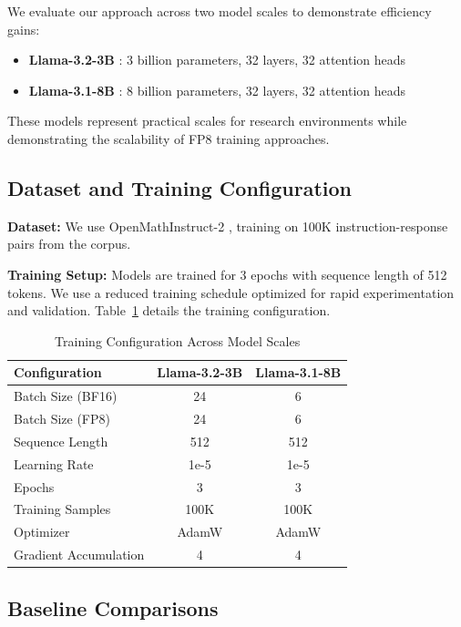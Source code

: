 \documentclass[conference]{IEEEtran}
\begin{document}
We evaluate our approach across two model scales to demonstrate efficiency gains:

\begin{itemize}
\item \textbf{Llama-3.2-3B} \cite{meta2024llama3.2}: 3 billion parameters, 32 layers, 32 attention heads
\item \textbf{Llama-3.1-8B} \cite{meta2024llama3.1}: 8 billion parameters, 32 layers, 32 attention heads
\end{itemize}

These models represent practical scales for research environments while demonstrating the scalability of FP8 training approaches.

\subsection{Dataset and Training Configuration}

\textbf{Dataset:} We use OpenMathInstruct-2 \cite{toshniwal2024openmath2}, training on 100K instruction-response pairs from the corpus.

\textbf{Training Setup:} Models are trained for 3 epochs with sequence length of 512 tokens. We use a reduced training schedule optimized for rapid experimentation and validation. Table~\ref{tab:training_config} details the training configuration.

\begin{table}[htbp]
\centering
\caption{Training Configuration Across Model Scales}
\begin{tabular}{@{}lcc@{}}
\toprule
\textbf{Configuration} & \textbf{Llama-3.2-3B} & \textbf{Llama-3.1-8B} \\
\midrule
Batch Size (BF16) & 24 & 6 \\
Batch Size (FP8) & 24 & 6 \\
Sequence Length & 512 & 512 \\
Learning Rate & 1e-5 & 1e-5 \\
Epochs & 3 & 3 \\
Training Samples & 100K & 100K \\
Optimizer & AdamW & AdamW \\
Gradient Accumulation & 4 & 4 \\
\bottomrule
\end{tabular}
\label{tab:training_config}
\end{table}

\subsection{Baseline Comparisons}
\end{document}
